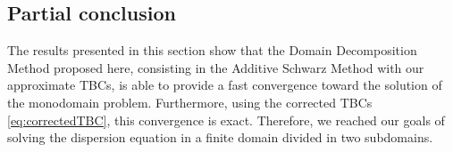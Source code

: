 %

\subsection{Partial conclusion}
 
\indent The results presented in this section show that the Domain Decomposition Method proposed here, consisting in the Additive Schwarz Method with our approximate TBCs, is able to provide a fast convergence toward the solution of the monodomain problem. Furthermore, using the corrected TBCs \eqref{eq:correctedTBC}, this convergence is exact. Therefore, we reached our goals of solving the dispersion equation in a finite domain divided in two subdomains.

